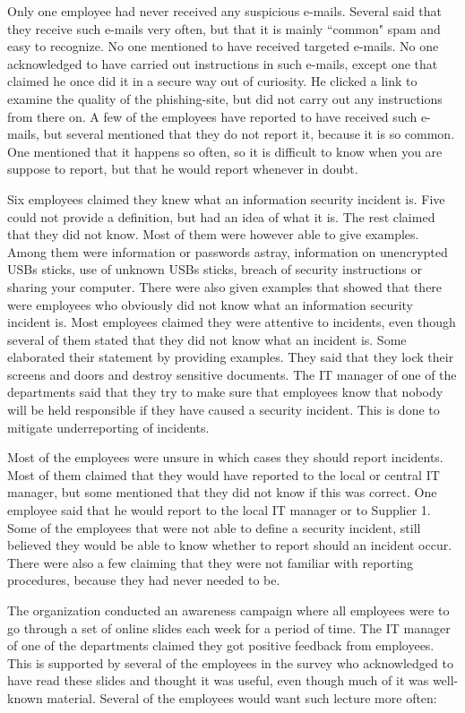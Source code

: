 Only one employee had never received any suspicious e-mails. Several said that they receive such e-mails very often, but that it is mainly ``common" spam and easy to recognize. No one mentioned to have received targeted e-mails. No one acknowledged to have carried out instructions in such e-mails, except one that claimed he once did it in a secure way out of curiosity. He clicked a link to examine the quality of the phishing-site, but did not carry out any instructions from there on. A few of the employees have reported to have received such e-mails, but several mentioned that they do not report it, because it is so common. One mentioned that it happens so often, so it is difficult to know when you are suppose to report, but that he would report whenever in doubt.

Six employees claimed they knew what an information security incident is. Five could not provide a definition, but had an idea of what it is. The rest claimed that they did not know. Most of them were however able to give examples. Among them were information or passwords astray, information on unencrypted \acsp{USB} sticks, use of unknown \acsp{USB} sticks, breach of security instructions or sharing your computer. There were also given examples that showed that there were employees who obviously did not know what an information security incident is. Most employees claimed they were attentive to incidents, even though several of them stated that they did not know what an incident is. Some elaborated their statement by providing examples. They said that they lock their screens and doors and destroy sensitive documents. The IT manager of one of the departments said that they try to make sure that employees know that nobody will be held responsible if they have caused a security incident. This is done to mitigate underreporting of incidents.

Most of the employees were unsure in which cases they should report incidents. Most of them claimed that they would have reported to the local or central IT manager, but some mentioned that they did not know if this was correct. One employee said that he would report to the local IT manager or to Supplier 1. Some of the employees that were not able to define a security incident, still believed they would be able to know whether to report should an incident occur. There were also a few claiming that they were not familiar with reporting procedures, because they had never needed to be.

The organization conducted an awareness campaign where all employees were to go through a set of online slides each week for a period of time. The IT manager of one of the departments claimed they got positive feedback from employees. This is supported by several of the employees in the survey who acknowledged to have read these slides and thought it was useful, even though much of it was well-known material. Several of the employees would want such lecture more often:

